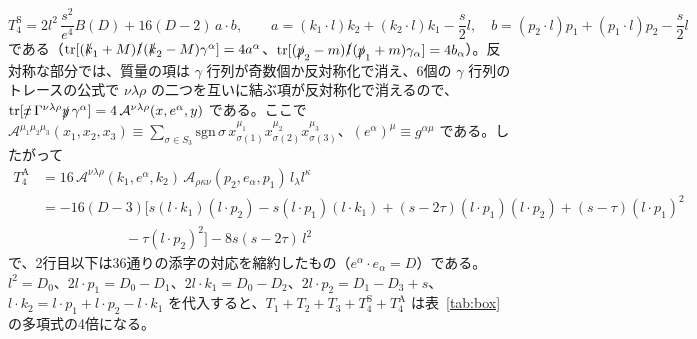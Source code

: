 \documentclass[a4paper,10pt]{ltjsarticle}
\begin{document}
\begin{equation*}
T_4^{\mathrm S}=2l^2\,\frac{s^2}{e^4}B(D)+16(D-2)\,a\cdot b,\qquad a=(k_1\cdot l)k_2+(k_2\cdot l)k_1-\frac s2l,\quad b=(p_2\cdot l)p_1+(p_1\cdot l)p_2-\frac s2l
\end{equation*}
である（$\mathrm{tr}[(\slashed k_1+M)\slashed l(\slashed k_2-M)\gamma^\alpha]=4a^\alpha$、$\mathrm{tr}[(\slashed p_2-m)\slashed l(\slashed p_1+m)\gamma_\alpha]=4b_\alpha$）。反対称な部分では、質量の項は $\gamma$ 行列が奇数個か反対称化で消え、6個の $\gamma$ 行列のトレースの公式で $\nu\lambda\rho$ の二つを互いに結ぶ項が反対称化で消えるので、$\mathrm{tr}[\slashed x\,\Gamma^{\nu\lambda\rho}\slashed y\,\gamma^\alpha]=4\,\mathcal A^{\nu\lambda\rho}(x,e^\alpha,y)$ である。ここで $\mathcal A^{\mu_1\mu_2\mu_3}(x_1,x_2,x_3)\equiv\sum_{\sigma\in S_3}\mathrm{sgn}\,\sigma\,x_{\sigma(1)}^{\mu_1}x_{\sigma(2)}^{\mu_2}x_{\sigma(3)}^{\mu_3}$、$(e^\alpha)^\mu\equiv g^{\alpha\mu}$ である。したがって
\begin{equation*}
\begin{aligned}
T_4^{\mathrm A}&=16\,\mathcal A^{\nu\lambda\rho}(k_1,e^\alpha,k_2)\,\mathcal A_{\rho\kappa\nu}(p_2,e_\alpha,p_1)\,l_\lambda l^\kappa\\
&=-16(D-3)\bigl[s(l\cdot k_1)(l\cdot p_2)-s(l\cdot p_1)(l\cdot k_1)+(s-2\tau)(l\cdot p_1)(l\cdot p_2)+(s-\tau)(l\cdot p_1)^2\\
&\hspace{6em}-\tau(l\cdot p_2)^2\bigr]-8s(s-2\tau)\,l^2
\end{aligned}
\end{equation*}
で、2行目以下は36通りの添字の対応を縮約したもの（$e^\alpha\cdot e_\alpha=D$）である。$l^2=D_0$、$2l\cdot p_1=D_0-D_1$、$2l\cdot k_1=D_0-D_2$、$2l\cdot p_2=D_1-D_3+s$、$l\cdot k_2=l\cdot p_1+l\cdot p_2-l\cdot k_1$ を代入すると、$T_1+T_2+T_3+T_4^{\mathrm S}+T_4^{\mathrm A}$ は表~\ref{tab:box} の多項式の4倍になる。
\end{document}
